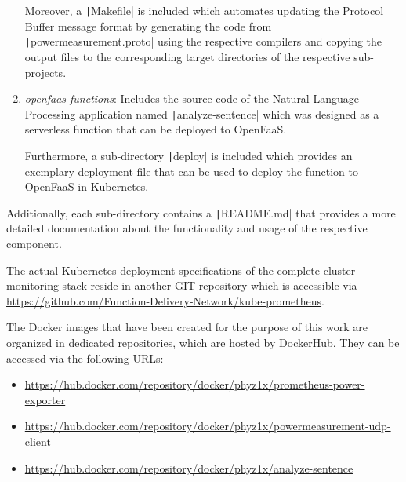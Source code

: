 \begin{enumerate}
    Moreover, a \texttt|Makefile| is included which automates updating the Protocol Buffer message format by generating the code from \texttt|powermeasurement.proto| using the respective compilers and copying the output files to the corresponding target directories of the respective sub-projects. 
    
    \item \textit{openfaas-functions}: Includes the source code of the Natural Language Processing application named \texttt|analyze-sentence| which was designed as a serverless function that can be deployed to OpenFaaS.
    
    Furthermore, a sub-directory \texttt|deploy| is included which provides an exemplary deployment file that can be used to deploy the function to OpenFaaS in Kubernetes.
\end{enumerate}

Additionally, each sub-directory contains a \texttt|README.md| that provides a more detailed documentation about the functionality and usage of the respective component.


The actual Kubernetes deployment specifications of the complete cluster monitoring stack reside in another GIT repository which is accessible via \url{https://github.com/Function-Delivery-Network/kube-prometheus}.

The Docker images that have been created for the purpose of this work are organized in dedicated repositories, which are hosted by DockerHub. They can be accessed via the following URLs:

\begin{itemize}
    \item \url{https://hub.docker.com/repository/docker/phyz1x/prometheus-power-exporter}
    \item \url{https://hub.docker.com/repository/docker/phyz1x/powermeasurement-udp-client}
    \item \url{https://hub.docker.com/repository/docker/phyz1x/analyze-sentence}
\end{itemize}